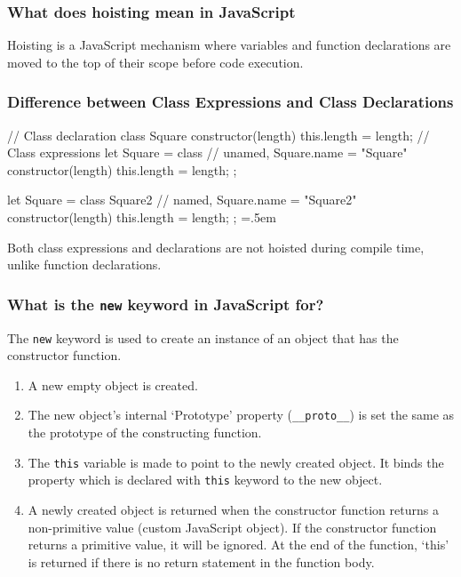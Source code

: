\documentclass[12pt, a4paper]{article}
\newcommand{\code}[1]{\texttt{#1}}
\newenvironment{lcverbatim}
 {\SaveVerbatim{cverb}}
 {\endSaveVerbatim
  \flushleft\fboxrule=0pt\fboxsep=.5em
  \colorbox{test}{%
    \makebox[\dimexpr\linewidth-2\fboxsep][l]{\BUseVerbatim{cverb}}%
  }
  \endflushleft
}
\begin{document}
\subsubsection*{What does hoisting mean in JavaScript}
Hoisting is a JavaScript mechanism where variables and function declarations are moved to the top of their scope before code execution.

\subsubsection*{Difference between Class Expressions and Class Declarations}
\begin{lcverbatim}
// Class declaration
class Square {
    constructor(length) {
        this.length = length;
    }
}
// Class expressions
let Square = class {          // unamed, Square.name = "Square"
  constructor(length) {
    this.length = length;
  }
};

let Square = class Square2 {  // named, Square.name = "Square2"
  constructor(length) {
    this.length = length;
  }
};
\end{lcverbatim}

Both class expressions and declarations are not hoisted during compile time, unlike function declarations.

\subsubsection*{What is the \code{new} keyword in JavaScript for?}
The \code{new} keyword is used to create an instance of an object that has the constructor function.
\begin{enumerate}
    \item A new empty object is created.
    \item The new object’s internal ‘Prototype’ property (\code{\_\_proto\_\_}) is set the same as the prototype of the constructing function.
    \item The \code{this} variable is made to point to the newly created object. It binds the property which is declared with \code{this} keyword to the new object.
    \item A newly created object is returned when the constructor function returns a non-primitive value (custom JavaScript object).
          If the constructor function returns a primitive value, it will be ignored.
          At the end of the function, ‘this’ is returned if there is no return statement in the function body.    
\end{enumerate}
\end{document}
